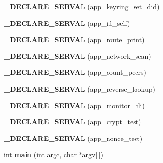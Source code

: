 \begin{DoxyCompactItemize}
\item 
\hypertarget{serval-client_8c_aedd8f48d8b0c34b4842e636a18dd2f00}{{\bfseries \-\_\-\-D\-E\-C\-L\-A\-R\-E\-\_\-\-S\-E\-R\-V\-A\-L} (app\-\_\-keyring\-\_\-set\-\_\-did)}\label{serval-client_8c_aedd8f48d8b0c34b4842e636a18dd2f00}

\item 
\hypertarget{serval-client_8c_a84eb7919a46ffa0e56c4d5760b5d7e91}{{\bfseries \-\_\-\-D\-E\-C\-L\-A\-R\-E\-\_\-\-S\-E\-R\-V\-A\-L} (app\-\_\-id\-\_\-self)}\label{serval-client_8c_a84eb7919a46ffa0e56c4d5760b5d7e91}

\item 
\hypertarget{serval-client_8c_a8fb9656ad1b78e0bf980b06ff0d3692f}{{\bfseries \-\_\-\-D\-E\-C\-L\-A\-R\-E\-\_\-\-S\-E\-R\-V\-A\-L} (app\-\_\-route\-\_\-print)}\label{serval-client_8c_a8fb9656ad1b78e0bf980b06ff0d3692f}

\item 
\hypertarget{serval-client_8c_a12c015a85b7b77786dafdf20c5c6bf11}{{\bfseries \-\_\-\-D\-E\-C\-L\-A\-R\-E\-\_\-\-S\-E\-R\-V\-A\-L} (app\-\_\-network\-\_\-scan)}\label{serval-client_8c_a12c015a85b7b77786dafdf20c5c6bf11}

\item 
\hypertarget{serval-client_8c_abc47d452c0882407b185351c83e68825}{{\bfseries \-\_\-\-D\-E\-C\-L\-A\-R\-E\-\_\-\-S\-E\-R\-V\-A\-L} (app\-\_\-count\-\_\-peers)}\label{serval-client_8c_abc47d452c0882407b185351c83e68825}

\item 
\hypertarget{serval-client_8c_ac93e781fff164a77805e37d23c67fa64}{{\bfseries \-\_\-\-D\-E\-C\-L\-A\-R\-E\-\_\-\-S\-E\-R\-V\-A\-L} (app\-\_\-reverse\-\_\-lookup)}\label{serval-client_8c_ac93e781fff164a77805e37d23c67fa64}

\item 
\hypertarget{serval-client_8c_a2b600eb8bf56c6d740d6d5ab99042cb6}{{\bfseries \-\_\-\-D\-E\-C\-L\-A\-R\-E\-\_\-\-S\-E\-R\-V\-A\-L} (app\-\_\-monitor\-\_\-cli)}\label{serval-client_8c_a2b600eb8bf56c6d740d6d5ab99042cb6}

\item 
\hypertarget{serval-client_8c_a492ea3e4a6f48f0cc03dc27c8bde749d}{{\bfseries \-\_\-\-D\-E\-C\-L\-A\-R\-E\-\_\-\-S\-E\-R\-V\-A\-L} (app\-\_\-crypt\-\_\-test)}\label{serval-client_8c_a492ea3e4a6f48f0cc03dc27c8bde749d}

\item 
\hypertarget{serval-client_8c_ac7f92bf249a070e2799acf2c094f8fef}{{\bfseries \-\_\-\-D\-E\-C\-L\-A\-R\-E\-\_\-\-S\-E\-R\-V\-A\-L} (app\-\_\-nonce\-\_\-test)}\label{serval-client_8c_ac7f92bf249a070e2799acf2c094f8fef}

\item 
\hypertarget{serval-client_8c_a0ddf1224851353fc92bfbff6f499fa97}{int {\bfseries main} (int argc, char $\ast$argv\mbox{[}$\,$\mbox{]})}\label{serval-client_8c_a0ddf1224851353fc92bfbff6f499fa97}

\end{DoxyCompactItemize}



